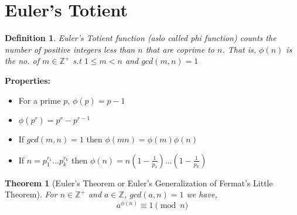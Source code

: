 \documentclass[12pt,a4paper]{article}
\newcommand{\Z}{\mathbb{Z}}
\newtheorem{thm}{Theorem}
\newtheorem{defn}{Definition}
\begin{document}
\section{Euler's Totient}
\begin{defn}
	Euler's Totient function (aslo called phi function) counts the number of positive integers less than $n$ that are coprime to $n$. That is, $\phi (n)$ is the no. of $m\in \Z^{+}$ s.t $1\le m < n$ and $gcd(m,n)=1$
\end{defn}
\textbf{Properties: }
\begin{itemize}
	\item For a prime $p$, $\phi (p)=p-1$
	\item $\phi (p^r)=p^r-p^{r-1}$
	\item If $gcd(m,n)=1$ then $\phi(mn)=\phi (m) \phi (n)$
	\item If $n=p_{1}^{r_{1}}\dots p_{k}^{r_{k}}$ then $\phi (n)=n \left(1 - \frac{1}{p_{1}}\right) \dots \left(1-\frac{1}{p_{k}}\right)$
\end{itemize}
\begin{thm}[Euler's Theorem or Euler's Generalization of Fermat's Little Theorem]
	For $n \in \Z^{+}$ and $a\in \Z$, $gcd(a,n)=1$ we have,
	$$
		a^{\phi (n)} \equiv 1 \pmod n
	$$
\end{thm}
\end{document}
